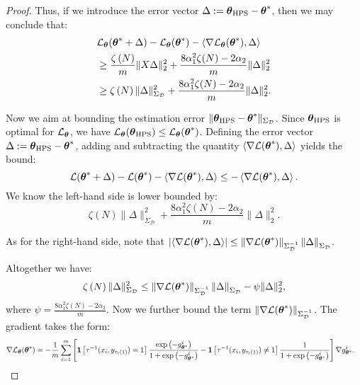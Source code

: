 \begin{proof}
Thus, if we introduce the error vector $\Delta:={\boldsymbol{\theta}}_{\text{HPS}}-{\boldsymbol{\theta}}^{*}$, then we may conclude that:
\begin{equation*}
\begin{aligned}
&\mathcal{L}_{{\boldsymbol{\theta}}}({\boldsymbol{\theta}}^{*}+\Delta)-\mathcal{L}_{{\boldsymbol{\theta}}}({\boldsymbol{\theta}}^{*})-\left\langle\nabla\mathcal{L}_{{\boldsymbol{\theta}}}({\boldsymbol{\theta}}^{*}), \Delta\right\rangle \\
&\geq \frac{\zeta\left(N\right)}{m}\|X\Delta\|_{2}^{2}+\frac{8\alpha_{1}^{2}\zeta(N)-2\alpha_{2}}{m}\|\Delta\|_{2}^{2} \\
& \geq \zeta\left(N\right)\|\Delta\|_{{\Sigma}_{\mathcal{D}}}^{2}+\frac{8\alpha_{1}^{2}\zeta(N)-2\alpha_{2}}{m}\|\Delta\|_{2}^{2}.
\end{aligned}
\end{equation*}

Now we aim at bounding the estimation error $\|{\boldsymbol{\theta}}_{\text{HPS}}-{\boldsymbol{\theta}}^{*}\|_{{\Sigma}_{\mathcal{D}}}$. Since ${\boldsymbol{\theta}}_{\text{HPS}}$ is optimal for $\mathcal{L}_{{\boldsymbol{\theta}}}$, we have $\mathcal{L}_{{\boldsymbol{\theta}}}({\boldsymbol{\theta}}_{\text{HPS}})\leq\mathcal{L}_{{\boldsymbol{\theta}}}({\boldsymbol{\theta}}^{*})$. Defining the error vector $\Delta:={\boldsymbol{\theta}}_{\text{HPS}}-{\boldsymbol{\theta}}^{*}$, adding and subtracting the quantity $\left\langle\nabla\mathcal{L}({\boldsymbol{\theta}}^{*}), \Delta\right\rangle $ yields the bound:
\begin{equation*}
\mathcal{L}({\boldsymbol{\theta}}^{*}+\Delta)-\mathcal{L}({\boldsymbol{\theta}}^{*})-\left\langle\nabla\mathcal{L}({\boldsymbol{\theta}}^{*}), \Delta\right\rangle \leq -\left\langle\nabla\mathcal{L}({\boldsymbol{\theta}}^{*}), \Delta\right\rangle.
\end{equation*}
We know the left-hand side is lower bounded by:
\begin{equation*}
\zeta\left(N\right)\|\Delta\|_{{\Sigma}_{\mathcal{D}}}^{2}+\frac{8\alpha_{1}^{2}\zeta(N)-2\alpha_{2}}{m}\|\Delta\|_{2}^{2}.
\end{equation*}

As for the right-hand side, note that $\left|\left\langle\nabla\mathcal{L}({\boldsymbol{\theta}}^{*}), \Delta\right\rangle\right|\leq\left\|\nabla\mathcal{L}({\boldsymbol{\theta}}^{*})\right\|_{{\Sigma}^{-1}_{\mathcal{D}}}\left\|\Delta\right\|_{{\Sigma}_{\mathcal{D}}}$. 

Altogether we have:
\begin{equation*}
\zeta\left(N\right)\|\Delta\|_{{\Sigma}_{\mathcal{D}}}^{2}\leq\left\|\nabla\mathcal{L}({\boldsymbol{\theta}}^{*})\right\|_{{\Sigma}^{-1}_{\mathcal{D}}}\left\|\Delta\right\|_{{\Sigma}_{\mathcal{D}}}-\psi\|\Delta\|^{2}_{2},
\end{equation*}
where $\psi = \frac{8\alpha_{1}^{2}\zeta(N)-2\alpha_{2}}{m}$. Now we further bound the term $\left\|\nabla\mathcal{L}({\boldsymbol{\theta}}^{*})\right\|_{{\Sigma}^{-1}_{\mathcal{D}}}$. 
The gradient takes the form:
\begin{equation*}
\begin{aligned}
&\nabla \mathcal{L}_{{\boldsymbol{\theta}}}({\boldsymbol{\theta}}^{*})=-\frac{1}{m}\sum\limits^{m}_{i=1}\left[\mathbf{1}\left[\tau^{-1}(x_{i}, y_{\tau_{i}{\left(1\right)}})=1\right]\frac{\exp\left(-g^{i}_{{\boldsymbol{\theta}}^{*}}\right)}{1+\exp\left(-g^{i}_{{\boldsymbol{\theta}}^{*}}\right)}-\mathbf{1}\left[\tau^{-1}(x_{i}, y_{\tau_{i}{\left(1\right)}})\neq1\right]\frac{1}{1+\exp\left(-g^{i}_{{\boldsymbol{\theta}}^{*}}\right)}\right]\nabla g^{i}_{{\boldsymbol{\theta}}^{*}}.
\end{aligned}
\end{equation*}


\end{proof}

